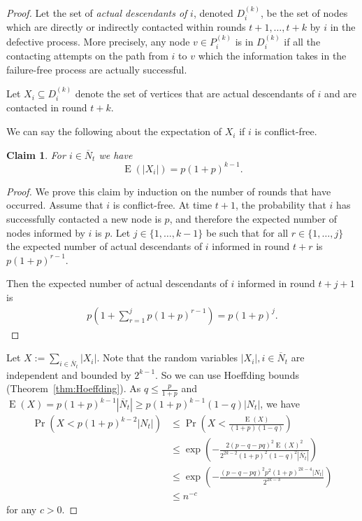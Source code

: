 \documentclass[12pt]{article}
\newtheorem{claim}[theorem]{Claim}
\DeclareMathOperator{\E}{E}
\newcommand{\oN}{{\overline{N}}}
\newcommand{\thmref}[1]{Theorem~\ref{thm:#1}}
\begin{document}
{\begin{proof}
Let the set of 
\emph{actual descendants of} $i$, denoted $D^{(k)}_i$, be the set of nodes which are directly or indirectly contacted within rounds $t+1,\dots,t+k$ by $i$ in the defective process. More precisely, any node $v \in P^{(k)}_i$ is in $D^{(k)}_i$
if all the contacting attempts on the path from $i$ to $v$ which the information
takes in the failure-free process are actually successful.

Let $X_i \subseteq D^{(k)}_i$ denote the set of vertices that are actual descendants of $i$ and are contacted in round $t+k$. 

We can say the following about the expectation of $X_i$ if $i$ is conflict-free.
\begin{claim}
For $i \in \oN_t$ we have
\begin{equation*}
\E\left(\left|X_i\right|\right)=p(1+p)^{k-1}.
\end{equation*}
\end{claim}

\begin{proof}
We prove this claim by induction on the number of rounds that have occurred. Assume that $i$ is conflict-free.
At time $t+1$, the probability that $i$ has successfully contacted a new node is $p$, and therefore the expected number of nodes informed by $i$ is $p$.
Let $j \in \{1, \dots ,k-1\}$ be such that for all $r \in \{1, \dots ,j\}$ the expected number of actual descendants of $i$ informed in round $t+r$ is $p(1+p)^{r-1}$.

Then the expected number of actual descendants of $i$ informed in round $t+j+1$ is 
	\begin{align*}
	p\left(1+ \sum_{r=1}^jp(1+p)^{r-1}\right)=p(1+p)^j.
	\end{align*}
\end{proof}
Let $X:=\sum_{i \in \oN_t}\left|X_i\right|$. 
Note that the random variables $|X_i|,  i \in \oN_t$ are independent and bounded by $2^{k-1}$. So we can use Hoeffding bounds (\thmref{Hoeffding}). As $q \leq \frac{p}{1+p}$ and $\E(X) = p(1+p)^{k-1}|\oN_t| \geq p(1+p)^{k-1}(1-q)|N_t|$, we have
\begin{align*}
\Pr \left(X < p(1+p)^{k-2}|N_t|\right)
&\leq	\Pr \left(X < \frac{\E(X)}{(1+p)(1-q)}\right)\\
&\leq 	\exp\left(-\frac{2(p-q-pq)^2\E(X)^2}{2^{2k-2}(1+p)^2(1-q)^2|\oN_t|}\right)\\
&\leq	\exp\left(-\frac{(p-q-pq)^2p^2(1+p)^{2k-4}|N_t|}{2^{2k-3}}\right)\\
&\leq n^{-c}
\end{align*}
for any $c>0$.


\end{proof}}
\end{document}
